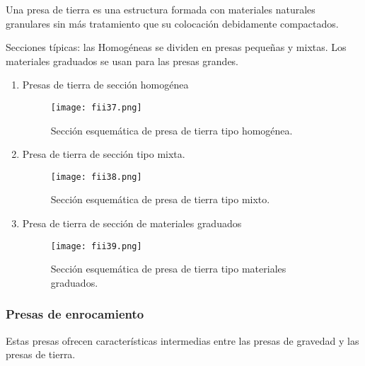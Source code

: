 \begin{definition}
	Una presa de tierra es una estructura formada con materiales naturales
	granulares sin más tratamiento que su colocación debidamente compactados.
\end{definition}

Secciones típicas: las Homogéneas se dividen en presas pequeñas y mixtas. Los materiales graduados se usan para las presas grandes.

\begin{enumerate}[noitemsep]
	\item Presas de tierra de sección homogénea
	      \begin{figure}[h!]
		      \centerline{\texttt{[image: fii37.png]}}
		      \caption{Sección esquemática de presa de tierra tipo homogénea.}
		      \label{fii37}
	      \end{figure}
	\item Presa de tierra de sección tipo mixta.
	      \begin{figure}[h!]
		      \centerline{\texttt{[image: fii38.png]}}
		      \caption{Sección esquemática de presa de tierra tipo mixto.}
		      \label{fii38}
	      \end{figure}
	\item Presa de tierra de sección de materiales graduados
	      \begin{figure}[h!]
		      \centerline{\texttt{[image: fii39.png]}}
		      \caption{Sección esquemática de presa de tierra tipo materiales graduados.}
		      \label{fii39}
	      \end{figure}
\end{enumerate}

\subsubsection{Presas de enrocamiento}

Estas presas ofrecen características intermedias entre las presas de gravedad y
las presas de tierra.

